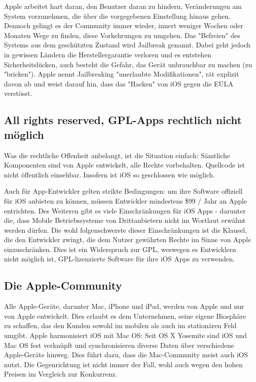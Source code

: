 Apple arbeitet hart daran, den Benutzer daran zu hindern, Veränderungen am System vorzunehmen, die über die vorgegebenen Einstellung hinaus gehen. Dennoch gelingt es der Community immer wieder, innert weniger Wochen oder Monaten Wege zu finden, diese Vorkehrungen zu umgehen. Das "Befreien" des Systems aus dem geschützten Zustand wird Jailbreak genannt\thinspace\cite{online:ios-jailbreak}. Dabei geht jedoch in gewissen Ländern die Herstellergarantie verloren und es entstehen Sicherheitslücken, auch besteht die Gefahr, das Gerät unbrauchbar zu machen (zu "bricken")\thinspace\cite{online:ios-whyjailbreak}. Apple nennt Jailbreaking "unerlaubte Modifikationen", rät explizit davon ab und weist darauf hin, dass das "Hacken" von iOS gegen die EULA verstösst\thinspace\cite{online:ios-dontjailbreak}.\\

\subsection{All rights reserved, GPL-Apps rechtlich nicht möglich}
Was die rechtliche Offenheit anbelangt, ist die Situation einfach: Sämtliche Komponenten sind von Apple entwickelt, alle Rechte vorbehalten. Quellcode ist nicht öffentlich einsehbar. Insofern ist iOS so geschlossen wie möglich.

Auch für App-Entwickler gelten strikte Bedingungen: um ihre Software offiziell für iOS anbieten zu können, müssen Entwickler mindestens \$99 / Jahr an Apple entrichten\thinspace\cite{online:ios-appstore}. Des Weiteren gibt es viele Einschränkungen für iOS Apps - darunter die, dass Mobile Betriebssysteme von Drittanbietern nicht im Wortlaut erwähnt werden dürfen\thinspace\cite{online:ios-guidelines}. Die wohl folgenschwerste dieser Einschränkungen ist die Klausel, die den Entwickler zwingt, die dem Nutzer gewährten Rechte im Sinne von Apple einzuschränken\thinspace\cite{online:ios-terms}. Dies ist ein Widerspruch zur GPL, weswegen es Entwicklern nicht möglich ist, GPL-lizenzierte Software für ihre iOS Apps zu verwenden\thinspace\cite{online:ios-gpl}. \\

\subsection{Die Apple-Community}
Alle Apple-Geräte, darunter Mac, iPhone und iPad, werden von Apple und nur von Apple entwickelt. Dies erlaubt es dem Unternehmen, seine eigene Biosphäre zu schaffen, das den Kunden sowohl im mobilen als auch im stationären Feld umgibt. Apple harmonisiert iOS mit Mac OS: Seit OS X Yosemite sind iOS und Mac OS fest verknüpft und synchronisieren diverse Daten über verschiedene Apple-Geräte hinweg. Dies führt dazu, dass die Mac-Community meist auch iOS nutzt. Die Gegenrichtung ist nicht immer der Fall, wohl auch wegen den hohen Preisen im Vergleich zur Konkurrenz.

